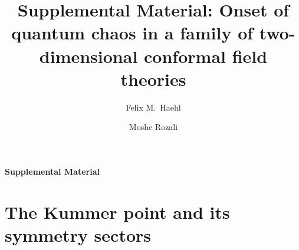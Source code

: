 \documentclass[aps,onecolumn,groupedaddress,nofootinbib,pra]{revtex4-2}
\begin{document}
\ifdefined\arXivversion
  \begin{center}\large\bfseries Supplemental Material\end{center}
  \setcounter{section}{0}
  \setcounter{table}{0}
\else
  \title{Supplemental Material: Onset of quantum chaos in a family of two-dimensional conformal field theories}
  \author{Felix M.\ Haehl}
  \author{Moshe Rozali}
  \maketitle
\fi
\setcounter{secnumdepth}{1}
\setcounter{equation}{0}
\setcounter{figure}{0}
\renewcommand{\thesection}{S\arabic{section}}
\renewcommand{\theequation}{S\arabic{equation}}
\renewcommand{\thefigure}{S\arabic{figure}}
\renewcommand{\thetable}{S\arabic{table}}
\renewcommand{\theHsection}{S\arabic{section}}
\renewcommand{\theHequation}{S\arabic{equation}}
\renewcommand{\theHfigure}{S\arabic{figure}}
\renewcommand{\theHtable}{S\arabic{table}}



\section{The Kummer point and its symmetry sectors}
\label{app:kummer}
\end{document}
